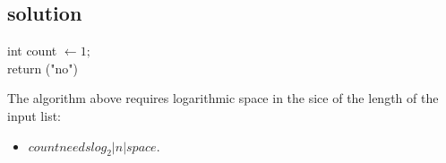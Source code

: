 
% 
% 
% 
% 
% 
% 
% 

\subsection{solution}

\begin{algorithm}[H]
		int count $\leftarrow 1;$\\
		 {
		}
		return ("no")
	\label{alg:n-sorted}
\end{algorithm}%

The algorithm above requires logarithmic space in the sice of the length of the input list:\\
\newline
\begin{itemize}
 \item $ count needs log_2|n| space.$
\end{itemize}

